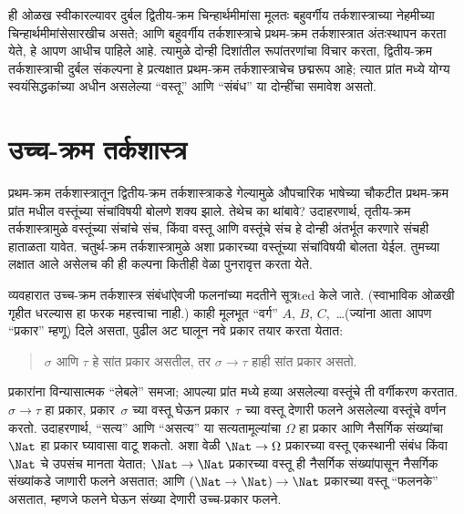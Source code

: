 ही ओळख स्वीकारल्यावर दुर्बल द्वितीय-क्रम चिन्हार्थमीमांसा मूलतः बहुवर्गीय
तर्कशास्त्राच्या नेहमीच्या चिन्हार्थमीमांसेसारखीच असते; आणि बहुवर्गीय
तर्कशास्त्राचे प्रथम-क्रम तर्कशास्त्रात अंतःस्थापन करता येते, हे आपण आधीच
पाहिले आहे. त्यामुळे दोन्ही दिशांतील रूपांतरणांचा विचार करता, द्वितीय-क्रम
तर्कशास्त्राची दुर्बल संकल्पना हे प्रत्यक्षात प्रथम-क्रम तर्कशास्त्राचेच
छद्मरूप आहे; त्यात प्रांत मध्ये योग्य स्वयंसिद्धकांच्या अधीन असलेल्या
“वस्तू” आणि “संबंध” या दोन्हींचा समावेश असतो.












\section{उच्च-क्रम तर्कशास्त्र}\label{fol:byd:hol:sec}

प्रथम-क्रम तर्कशास्त्रातून द्वितीय-क्रम तर्कशास्त्राकडे गेल्यामुळे औपचारिक
भाषेच्या चौकटीत प्रथम-क्रम प्रांत मधील वस्तूंच्या संचांविषयी बोलणे शक्य
झाले. तेथेच का थांबावे? उदाहरणार्थ, तृतीय-क्रम तर्कशास्त्रामुळे वस्तूंच्या
संचांचे संच, किंवा वस्तू आणि वस्तूंचे संच हे दोन्ही अंतर्भूत करणारे संचही
हाताळता यावेत. चतुर्थ-क्रम तर्कशास्त्रामुळे अशा प्रकारच्या वस्तूंच्या
संचांविषयी बोलता येईल. तुमच्या लक्षात आले असेलच की ही कल्पना कितीही वेळा
पुनरावृत्त करता येते.

व्यवहारात उच्च-क्रम तर्कशास्त्र संबंधांऐवजी फलनांच्या मदतीने
सूत्रted केले जाते. (स्वाभाविक ओळखी गृहीत धरल्यास हा फरक महत्त्वाचा
नाही.) काही मूलभूत “वर्ग” $A$, $B$, $C$,~\dots (ज्यांना आता आपण “प्रकार”
म्हणू) दिले असता, पुढील अट घालून नवे प्रकार तयार करता येतात:
\begin{quote}
$\sigma$ आणि $\tau$ हे सांत प्रकार असतील, तर $\sigma \to \tau$ हाही सांत
प्रकार असतो.
\end{quote}
प्रकारांना विन्यासात्मक “लेबले” समजा; आपल्या प्रांत मध्ये हव्या असलेल्या
वस्तूंचे ती वर्गीकरण करतात. $\sigma \to \tau$ हा प्रकार, प्रकार~$\sigma$ च्या
वस्तू घेऊन प्रकार~$\tau$ च्या वस्तू देणारी फलने असलेल्या वस्तूंचे वर्णन करतो.
उदाहरणार्थ, “सत्य” आणि “असत्य” या सत्यतामूल्यांचा $\Omega$ हा प्रकार आणि
नैसर्गिक संख्यांचा $\Nat$ हा प्रकार घ्यावासा वाटू शकतो. अशा वेळी $\Nat \to
\Omega$ प्रकारच्या वस्तू एकस्थानी संबंध किंवा $\Nat$ चे उपसंच मानता येतात;
$\Nat \to \Nat$ प्रकारच्या वस्तू ही नैसर्गिक संख्यांपासून नैसर्गिक संख्यांकडे
जाणारी फलने असतात; आणि $(\Nat \to \Nat) \to \Nat$ प्रकारच्या वस्तू
“फलनके” असतात, म्हणजे फलने घेऊन संख्या देणारी उच्च-प्रकार फलने.

